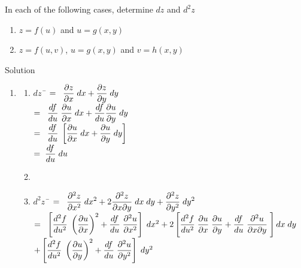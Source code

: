 \begin{example}

In each of the following cases, determine $dz$ and $d^2z$
\begin{multicols}{2}
\begin{enumerate}
\item $z=f(u)$ and $u=g(x,y)$
\item  $z=f(u,v)$, $u=g(x,y)$ and $v=h(x,y)$
\end{enumerate}
\end{multicols}

Solution 

\begin{enumerate}
\item \begin{enumerate}
\item \begin{tabbing}
$dz \;\; $\= $ = \;\; \displaystyle\frac{\partial z}{\partial x} \; dx + \displaystyle\frac{\partial z}{\partial y} \; dy $\\[0.2cm]
\> $ = \;\;\displaystyle\frac{d f}{d u}\;\displaystyle\frac{\partial u}{\partial x} \; dx+\displaystyle\frac{df}{du}\displaystyle\frac{\partial u}{\partial y}\; dy$\\[0.2cm]
\>$ = \;\;\displaystyle\frac{d f}{d u}\; \left [\displaystyle\frac{\partial u}{\partial x} \; dx + \displaystyle\frac{\partial u}{\partial y} \; dy \right ]$\\[0.2cm]
\>$ = \;\displaystyle\frac{d f}{d u}\; du$
\end{tabbing}
\item[]
\item \begin{tabbing}
$d^2 z \;\; $\= $ = \;\; \displaystyle\frac{\partial^2 z}{\partial x^2} \; dx^2 + 2 \displaystyle\frac{\partial^2 z}{\partial x \partial y}\;   dx \; dy + \displaystyle\frac{\partial^2 z}{\partial y^2} \; dy^2$\\[0.2cm]
\>$ = \;\; \left [ \displaystyle\frac{d^2 f}{d u^2} \; \left(\displaystyle\frac{\partial u}{\partial x} \right)^2  + \displaystyle\frac{d f}{d u}\; \displaystyle\frac{\partial^2 u}{\partial x^2} \right] \; dx^2 +  2 \left[ \displaystyle\frac{d^2 f}{d u^2} \; \displaystyle\frac{\partial u}{\partial x} \;\displaystyle\frac{\partial u}{\partial y} + \displaystyle\frac{d f}{d u}\;\displaystyle\frac{\partial^2 u}{\partial x \partial y} \; \right ] dx \; dy
$\\[0.2cm]
\> \hspace{7.5cm} $ + \left[\displaystyle\frac{d^2 f}{d u^2} \; \left(\displaystyle\frac{\partial u}{\partial y} \right)^2  + \displaystyle\frac{d f}{d u}\; \displaystyle\frac{\partial^2 u}{\partial y^2} \right] \; dy^2$\\[0.2cm]

\end{tabbing}
\end{enumerate}
\end{enumerate}
\end{example}
